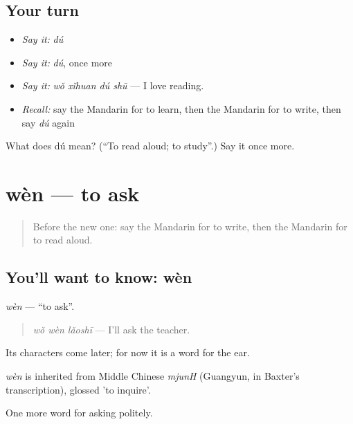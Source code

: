 \subsection*{Your turn}
\begin{itemize}
\raggedright
  \item \emph{Say it:} \emph{dú}
  \item \emph{Say it:} \emph{dú}, once more
  \item \emph{Say it:} \emph{wǒ xǐhuan dú shū} — I love reading.
  \item \emph{Recall:} say the Mandarin for to learn, then the Mandarin for to write, then say \emph{dú} again
\end{itemize}

\begin{tcolorbox}[breakable,colback=teal!4,colframe=teal!35!black,title={Before you move on}]
What does dú mean? (\textquotedblleft{}To read aloud; to study\textquotedblright{}.) Say it once more.
\end{tcolorbox}
\section[wèn]{wèn — to ask}

\label{lesson:ZH-C54-wen}



\begin{quote}
Before the new one: say the Mandarin for to write, then the Mandarin for to read aloud.
\end{quote}

\subsection*{You'll want to know: wèn}
\emph{wèn} — \textquotedblleft{}to ask\textquotedblright{}.

\begin{quote}
\emph{wǒ wèn lǎoshī} — I'll ask the teacher.
\end{quote}

Its characters come later; for now it is a word for the ear.

\begin{cousinweb}
\emph{wèn} is inherited from Middle Chinese \emph{mjunH} (Guangyun, in Baxter's transcription), glossed 'to inquire'.
\end{cousinweb}

\begin{grammarlens}[title={What you've built}]
One more word for asking politely.
\end{grammarlens}

